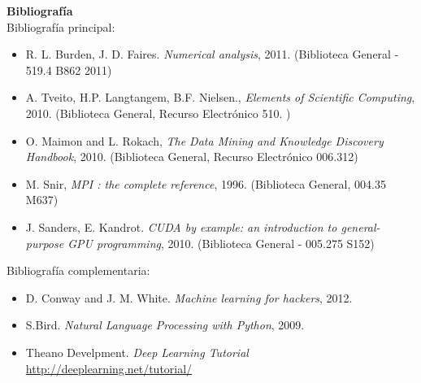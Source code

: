 \documentclass[letterpaper,10pt,onecolumn]{article}
\begin{document}
\noindent\textbf{\large {} \quad
  Bibliograf\'ia}\\[-0.2cm] 


\noindent\normalsize Bibliograf\'ia principal:

\begin{itemize}
\item R. L. Burden, J. D. Faires. \textit{Numerical analysis},
  2011. (Biblioteca General - 519.4 B862 2011)\\[-0.6cm]
\item A. Tveito, H.P. Langtangem, B.F. Nielsen., \textit{Elements of
  Scientific Computing}, 2010.  (Biblioteca General, Recurso
  Electr\'onico 510. )\\[-0.6cm] 
\item O. Maimon and L. Rokach, \textit{The Data Mining and Knowledge
  Discovery Handbook}, 2010. (Biblioteca General, Recurso
  Electr\'onico 006.312)\\[-0.6cm]
\item M. Snir, \textit{MPI : the complete reference},
  1996. (Biblioteca General, 004.35 M637)\\[-0.6cm]
\item J. Sanders, E. Kandrot. \textit{CUDA by example: an
  introduction to general-purpose GPU programming}, 2010. (Biblioteca
  General - 005.275 S152)\\[-0.2cm]
\end{itemize} 

\noindent\normalsize Bibliograf\'ia complementaria:

\begin{itemize}
\item D. Conway and J. M. White. \textit{Machine learning for
    hackers}, 2012.\\[-0.6cm]
\item S.Bird. \textit{Natural Language Processing with
  Python}, 2009.\\[-0.6cm]
\item Theano Develpment. \textit{Deep Learning Tutorial}
  \url{http://deeplearning.net/tutorial/}  \\[-0.2cm]
\end{itemize}
\end{document}

